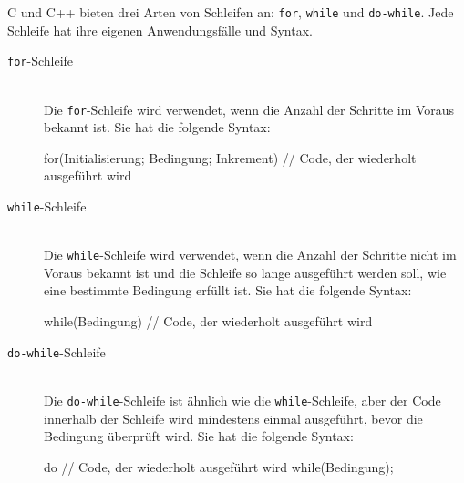 C und C++ bieten drei Arten von Schleifen an: \texttt{for}, \texttt{while} und \texttt{do-while}. Jede Schleife hat ihre eigenen Anwendungsfälle und Syntax.

\begin{description}
    \item[\texttt{for}-Schleife]\hfill\\
        Die \texttt{for}-Schleife wird verwendet, wenn die Anzahl der Schritte im Voraus bekannt ist. Sie hat die folgende Syntax:
\begin{code}
for(Initialisierung; Bedingung; Inkrement) {
    // Code, der wiederholt ausgeführt wird
}
\end{code}
    
    \item[\texttt{while}-Schleife]\hfill\\
        Die \texttt{while}-Schleife wird verwendet, wenn die Anzahl der Schritte nicht im Voraus bekannt ist und die Schleife so lange ausgeführt werden soll, wie eine bestimmte Bedingung erfüllt ist. Sie hat die folgende Syntax:
\begin{code}
while(Bedingung) {
    // Code, der wiederholt ausgeführt wird
}
\end{code}

    \item[\texttt{do-while}-Schleife]\hfill\\
        Die \texttt{do-while}-Schleife ist ähnlich wie die \texttt{while}-Schleife, aber der Code innerhalb der Schleife wird mindestens einmal ausgeführt, bevor die Bedingung überprüft wird. Sie hat die folgende Syntax:
\begin{code}
do {
    // Code, der wiederholt ausgeführt wird
} while(Bedingung);
\end{code}
\end{description}

